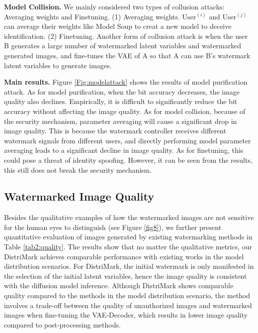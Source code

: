 \noindent\textbf{Model Collision.} We mainly considered two types of collusion attacks: Averaging weights and Finetuning. (1) Averaging weights. User$^{(i)}$ and User$^{(j)}$ can average their weights like Model Soup \cite{wortsman2022model} to creat a new model to deceive identification. 
(2) Finetuning. Another form of collusion attack is when the user B generates a large number of watermarked latent variables and watermarked generated images, and fine-tunes the VAE of A so that A can use B's watermark latent variables to generate images. 


\noindent\textbf{Main results.} Figure \ref{Fig:modelattack} shows the results of model purification attack. As for model purification, when the bit accuracy decreases, the image quality also declines. Empirically, it is difficult to significantly reduce the bit accuracy without affecting the image quality. As for model collision, because of the security mechanism, parameter averaging will cause a significant drop in image quality. This is because the watermark controller receives different watermark signals from different users, and directly performing model parameter averaging leads to a significant decline in image quality. As for finetuning, this could pose a threat of identity spoofing. However, it can be seen from the results, this still does not break the security mechanism. 




\subsection{Watermarked Image Quality}

Besides the  qualitative examples of how the watermarked  images are not sensitive for the human eyes to distinguish (see Figure \ref{fig8}), we further present quantitative evaluation of images generated by existing watermarking methods in Table \ref{tab2:quality}. The results show that no matter the qualitative metrics, our DistriMark
achieves comparable performance with existing works in the model distribution scenarios.  For DistriMark, the initial watermark is only manifested in the selection of the initial latent variables, hence the image quality is consistent with the diffusion model inference. %
Although DistriMark shows comparable quality compared to the methods in the model distribution scenario, the method involves a trade-off between the quality of unauthorized images and watermarked images when fine-tuning the VAE-Decoder, which results in lower image quality compared to post-processing methods. 


